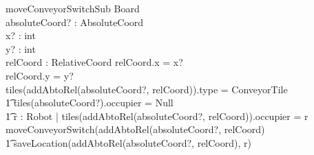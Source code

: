\documentclass[a4paper,11pt]{article}
\begin{document}
\begin{schema}{moveConveyorSwitchSub}
\Delta Board \\
absoluteCoord? : AbsoluteCoord \\
x? : int \\
y? : int \\
relCoord : RelativeCoord
\where
relCoord.x = x? \\
relCoord.y = y? \\
\IF tiles(addAbtoRel(absoluteCoord?, relCoord)).type = ConveyorTile \\ \t1
tiles(absoluteCoord?).occupier = Null \\ \t1
\exists r : Robot | tiles(addAbtoRel(absoluteCoord?, relCoord)).occupier = r \\
\THEN moveConveyorSwitch(addAbtoRel(absoluteCoord?, relCoord)\\ \t1
saveLocation(addAbtoRel(absoluteCoord?, relCoord), r)
\end{schema}
\end{document}
